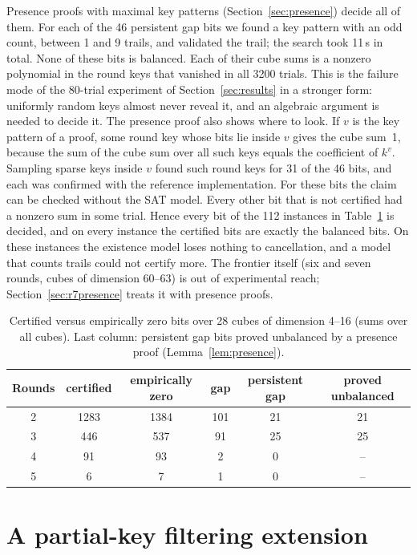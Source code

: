 \documentclass[11pt,a4paper]{article}
\theoremstyle{definition}
\theoremstyle{remark}
\begin{document}
Presence proofs with maximal key patterns (Section~\ref{sec:presence}) decide all of them. For each of the 46 persistent gap bits we found a key pattern with an odd count, between 1 and 9 trails, and validated the trail; the search took 11\,s in total. None of these bits is balanced. Each of their cube sums is a nonzero polynomial in the round keys that vanished in all 3200 trials. This is the failure mode of the 80-trial experiment of Section~\ref{sec:results} in a stronger form: uniformly random keys almost never reveal it, and an algebraic argument is needed to decide it. The presence proof also shows where to look. If $v$ is the key pattern of a proof, some round key whose bits lie inside $v$ gives the cube sum~1, because the sum of the cube sum over all such keys equals the coefficient of $k^v$. Sampling sparse keys inside $v$ found such round keys for 31 of the 46 bits, and each was confirmed with the reference implementation. For these bits the claim can be checked without the SAT model. Every other bit that is not certified had a nonzero sum in some trial. Hence every bit of the 112 instances in Table~\ref{tab:tight} is decided, and on every instance the certified bits are exactly the balanced bits. On these instances the existence model loses nothing to cancellation, and a model that counts trails could not certify more. The frontier itself (six and seven rounds, cubes of dimension 60--63) is out of experimental reach; Section~\ref{sec:r7presence} treats it with presence proofs.

\begin{table}[t]\centering
\caption{Certified versus empirically zero bits over 28 cubes of dimension 4--16 (sums over all cubes). Last column: persistent gap bits proved unbalanced by a presence proof (Lemma~\ref{lem:presence}).}\label{tab:tight}
\begin{tabular}{cccccc}
\toprule
Rounds & certified & empirically zero & gap & persistent gap & proved unbalanced\\
\midrule
2 & 1283 & 1384 & 101 & 21 & 21\\
3 & 446 & 537 & 91 & 25 & 25\\
4 & 91 & 93 & 2 & 0 & --\\
5 & 6 & 7 & 1 & 0 & --\\
\bottomrule
\end{tabular}
\end{table}

\section{A partial-key filtering extension}\label{sec:keyrec}
\end{document}

